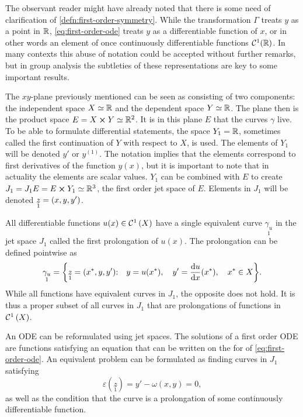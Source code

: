 The observant reader might have already noted that there is some need of clarification of \cref{defn:first-order-symmetry}.
While the transformation \(\Gamma\) treats \(y\) as a point in \(\mathbb{R}\), \cref{eq:first-order-ode} treats \(y\) as a differentiable function of \(x\), or in other words an element of once continuously differentiable functions \(\mathcal{C}^1(\mathbb{R})\).
In many contexts this abuse of notation could be accepted without further remarks, but in group analysis the subtleties of these representations are key to some important results.

The \(xy\)-plane previously mentioned can be seen as consisting of two components: the independent space \(X \simeq \mathbb{R}\) and the dependent space \(Y \simeq \mathbb{R}\).
The plane then is the product space \(E = X \cross Y \simeq \mathbb{R}^2\).
It is in this plane \(E\) that the curves \(\gamma\) live.
To be able to formulate differential statements, the space \(Y_1 = \mathbb{R}\), sometimes called the first continuation of \(Y\) with respect to \(X\), is used.
The elements of \(Y_1\) will be denoted \(y'\) or \(y^{(1)}\).
The notation implies that the elements correspond to first derivatives of the function \(y(x)\), but it is important to note that in actuality the elements are scalar values.
\(Y_1\) can be combined with \(E\) to create \(J_1 = J_1 E = E \cross Y_1 \simeq \mathbb{R}^3\), the first order jet space of \(E\).
Elements in \(J_1\) will be denoted \(\underset{1}{z} = \qty(x, y, y')\).

All differentiable functions \(u(x) \in \cont{1}{X}\) have a single equivalent curve \(\underset{1}{\gamma_u}\) in the jet space \(J_1\) called the first prolongation of \(u(x)\).
The prolongation can be defined pointwise as
\begin{equation}
  \underset{1}{\gamma_u} = \qty{\underset{1}{z} = \qty(\fixed{x}, y, y')\qq*{:} y = u(\fixed{x})\qc y' = \dv{u}{x}{(\fixed{x})}\qc \fixed{x} \in X}.
\end{equation}
While all functions have equivalent curves in \(J_1\), the opposite does not hold.
It is thus a proper subset of all curves in \(J_1\) that are prolongations of functions in \(\cont{1}{X}\).

An ODE can be reformulated using jet spaces.
The solutions of a first order ODE are functions satisfying an equation that can be written on the for of \cref{eq:first-order-ode}.
An equivalent problem can be formulated as finding curves in \(J_1\) satisfying
\begin{equation} \label{eq:first-order-jet-ode}
  \varepsilon(\underset{1}{z}) = y' - \omega(x,y) = 0,
\end{equation}
as well as the condition that the curve is a prolongation of some continuously differentiable function.

